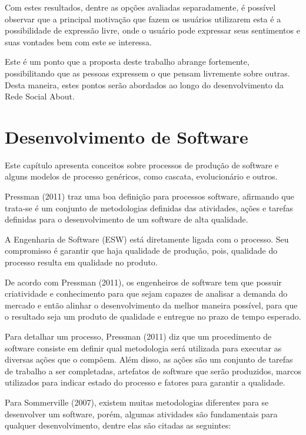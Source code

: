 Com estes resultados, dentre as opções avaliadas separadamente, é possível
observar que a principal motivação que fazem os usuários utilizarem esta
é a possibilidade de expressão livre, onde o usuário pode expressar seus sentimentos
e suas vontades bem com este se interessa.

Este é um ponto que a proposta deste trabalho abrange fortemente, possibilitando que
as pessoas expressem o que pensam livremente sobre outras. Desta maneira,
estes pontos serão abordados ao longo do desenvolvimento da Rede Social About.

\section{Desenvolvimento de Software}
\label{sec:processo_de_desenvolvimento_de_software}
Este capítulo apresenta conceitos sobre processos de produção de software e alguns modelos de processo genéricos, como cascata, evolucionário e outros.

Pressman (2011) traz uma boa definição para processos software, afirmando que trata-se é um conjunto de metodologias definidas das atividades, ações e tarefas definidas para o desenvolvimento de um software de alta qualidade.

A Engenharia de Software (ESW) está diretamente ligada com o processo. Seu compromisso é garantir que haja qualidade de produção, pois, qualidade do processo resulta em qualidade no produto.

De acordo com Pressman (2011), os engenheiros de software tem que possuir criatividade e conhecimento para que sejam capazes de analisar a demanda do mercado e então alinhar o desenvolvimento da melhor maneira possível, para que o resultado seja um produto de qualidade e entregue no prazo de tempo esperado.

 Para detalhar um processo, Pressman (2011) diz que um procedimento de software consiste em definir qual metodologia será utilizada para executar as diversas ações que o compõem. Além disso, as ações são um conjunto de tarefas de trabalho a ser completadas, artefatos de software que serão produzidos, marcos utilizados para indicar estado do processo e fatores para garantir a qualidade.

Para Sommerville (2007), existem muitas metodologias diferentes para se desenvolver um software, porém, algumas atividades são fundamentais para qualquer desenvolvimento, dentre elas são citadas as seguintes:

